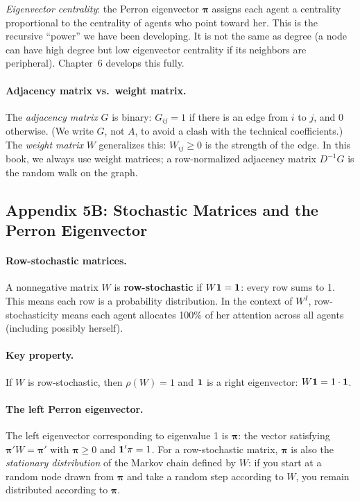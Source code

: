 \documentclass[../structural_economics_book.tex]{subfiles}
\begin{document}
\textit{Eigenvector centrality}: the Perron eigenvector $\boldsymbol{\pi}$ assigns each agent a centrality proportional to the centrality of agents who point toward her. This is the recursive ``power'' we have been developing. It is not the same as degree (a node can have high degree but low eigenvector centrality if its neighbors are peripheral). Chapter~6 develops this fully.

\paragraph{Adjacency matrix vs.\ weight matrix.}

The \textit{adjacency matrix} $G$ is binary: $G_{ij} = 1$ if there is an edge from $i$ to $j$, and $0$ otherwise. (We write $G$, not $A$, to avoid a clash with the technical coefficients.) The \textit{weight matrix} $W$ generalizes this: $W_{ij} \geq 0$ is the strength of the edge. In this book, we always use weight matrices; a row-normalized adjacency matrix $D^{-1}G$ is the random walk on the graph.


\subsection*{Appendix 5B: Stochastic Matrices and the Perron Eigenvector}
\label{ch05:app:stochastic}

\paragraph{Row-stochastic matrices.} A nonnegative matrix $W$ is \textbf{row-stochastic} if $W\mathbf{1} = \mathbf{1}$: every row sums to 1. This means each row is a probability distribution. In the context of $W^I$, row-stochasticity means each agent allocates 100\% of her attention across all agents (including possibly herself).

\paragraph{Key property.} If $W$ is row-stochastic, then $\rho(W) = 1$ and $\mathbf{1}$ is a right eigenvector: $W\mathbf{1} = 1 \cdot \mathbf{1}$.

\paragraph{The left Perron eigenvector.} The left eigenvector corresponding to eigenvalue 1 is $\boldsymbol{\pi}$: the vector satisfying $\boldsymbol{\pi}'W = \boldsymbol{\pi}'$ with $\boldsymbol{\pi} \geq 0$ and $\mathbf{1}'\pi = 1$. For a row-stochastic matrix, $\boldsymbol{\pi}$ is also the \textit{stationary distribution} of the Markov chain defined by $W$: if you start at a random node drawn from $\boldsymbol{\pi}$ and take a random step according to $W$, you remain distributed according to $\boldsymbol{\pi}$.
\end{document}
